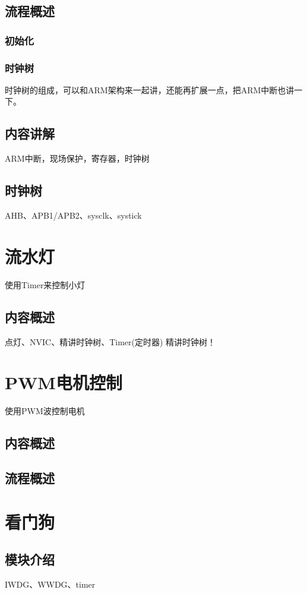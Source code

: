\documentclass[UTF8]{ctexart}
\begin{document}
\subsection{流程概述}
\subsubsection{初始化}



\subsubsection{时钟树}
时钟树的组成，可以和ARM架构来一起讲，还能再扩展一点，把ARM中断也讲一下。
\subsection{内容讲解}
ARM中断，现场保护，寄存器，时钟树
\subsection{时钟树}
AHB、APB1/APB2、sysclk、systick



\section{流水灯}
使用Timer来控制小灯
\subsection{内容概述}
点灯、NVIC、精讲时钟树、Timer(定时器)
精讲时钟树！



\section{PWM电机控制}
使用PWM波控制电机
\subsection{内容概述}
\subsection{流程概述}

\section{看门狗}

\subsection{模块介绍}
IWDG、WWDG、timer
\end{document}

